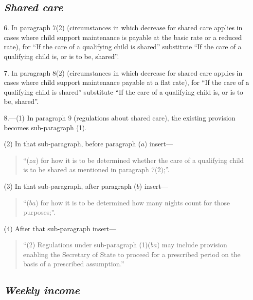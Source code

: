 \documentclass[12pt,a4paper]{article}
\begin{document}
\subsection*{\itshape Shared care}

6. In paragraph 7(2) (circumstances in which decrease for shared care applies in cases where child support maintenance is payable at the basic rate or a reduced rate), for “If the care of a qualifying child is shared” substitute “If the care of a qualifying child is, or is to be, shared”.

\medskip

7. In paragraph 8(2) (circumstances in which decrease for shared care applies in cases where child support maintenance payable at a flat rate), for “If the care of a qualifying child is shared” substitute “If the care of a qualifying child is, or is to be, shared”.

\medskip

8.---(1) In paragraph 9 (regulations about shared care), the existing provision becomes sub-paragraph (1).

(2) In that sub-paragraph, before paragraph ($a$) insert—
\begin{quotation}
“($za$) for how it is to be determined whether the care of a qualifying child is to be shared as mentioned in paragraph 7(2);”.
\end{quotation}

(3) In that sub-paragraph, after paragraph ($b$) insert—
\begin{quotation}
“($ba$) for how it is to be determined how many nights count for those purposes;”.
\end{quotation}

(4) After that sub-paragraph insert—
\begin{quotation}
“(2) Regulations under sub-paragraph (1)($ba$) may include provision enabling the 
Secretary of State
to proceed for a prescribed period on the basis of a prescribed assumption.”
\end{quotation}



\subsection*{\itshape Weekly income}
\end{document}
